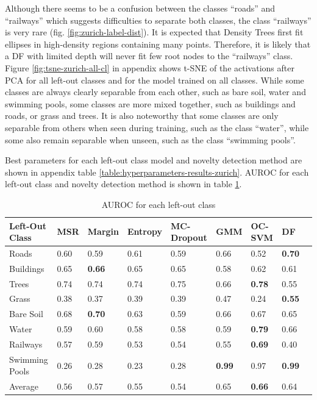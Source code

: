 \documentclass[10pt]{article}
\begin{document}
Although there seems to be a confusion between the classes ``roads'' and ``railways'' which suggests difficulties to separate both classes, the class ``railways'' is very rare (fig. \ref{fig:zurich-label-dist}). It is expected that Density Trees first fit ellipses in high-density regions containing many points. Therefore, it is likely that a \acrlong{DF} with limited depth will never fit few root nodes to the ``railways'' class. Figure \ref{fig:tsne-zurich-all-cl} in appendix shows \gls{t-SNE} of the activations after \gls{PCA} for all left-out classes and for the model trained on all classes. While some classes are always clearly separable from each other, such as bare soil, water and swimming pools, some classes are more mixed together, such as buildings and roads, or grass and trees. It is also noteworthy that some classes are only separable from others when seen during training, such as the class ``water'', while some also remain separable when unseen, such as the class ``swimming pools''.

Best parameters for each left-out class model and novelty detection method are shown in appendix table \ref{table:hyperparameters-results-zurich}. \gls{AUROC} for each left-out class and novelty detection method is shown in table \ref{table:zurich-auroc-nd}.

\begin{table}[H]
    \centering
    \begin{tabular}{@{}lllllllll@{}}
    \toprule
    Left-Out Class & MSR  & Margin     & Entropy & \gls{MC-Dropout} & \gls{GMM}     & \gls{OC-SVM}  & \gls{DF}                \\ \midrule
    Roads          &  0.60 &    0.59 &     0.61 &     0.59 &  0.66 &    0.52 &  \textbf{0.70} \\
    Buildings      &  0.65 &    \textbf{0.66} &     0.65 &     0.65 &  0.58 &    0.62 &  0.61 \\
    Trees          &  0.74 &    0.74 &     0.74 &     0.75 &  0.66 &    \textbf{0.78} &  0.55 \\
    Grass          &  0.38 &    0.37 &     0.39 &     0.39 &  0.47 &    0.24 &  \textbf{0.55} \\
    Bare Soil      &  0.68 &    \textbf{0.70} &     0.63 &     0.59 &  0.66 &    0.67 &  0.65 \\
    Water          &  0.59 &    0.60 &     0.58 &     0.58 &  0.59 &    \textbf{0.79} &  0.66 \\
    Railways       &  0.57 &    0.59 &     0.53 &     0.54 &  0.55 &    \textbf{0.69} &  0.40 \\
    Swimming Pools &  0.26 &    0.28 &     0.23 &     0.28 &  \textbf{0.99} &    0.97 &  \textbf{0.99} \\\midrule
    Average       &    0.56 & 0.57 & 0.55 & 0.54 & 0.65 & \textbf{0.66} & 0.64 \\\bottomrule
    \end{tabular}
    \caption{\gls{AUROC} for each left-out class}
    \label{table:zurich-auroc-nd}
\end{table}
\end{document}
